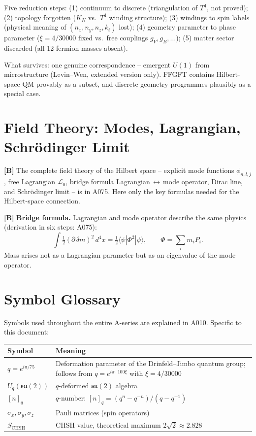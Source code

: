 Five reduction steps: (1) continuum to discrete (triangulation of $T^4$, not
proved); (2) topology forgotten ($K_N$ vs.\ $T^4$ winding structure); (3) windings
to spin labels (physical meaning of $(n_x,n_y,n_z,k_t)$ lost); (4) geometry
parameter to phase parameter ($\xi=4/30000$ fixed vs.\ free couplings
$g_V,g_B,\ldots$); (5) matter sector discarded (all 12 fermion masses absent).

What survives: one genuine correspondence -- emergent $U(1)$ from microstructure
(Levin--Wen, extended version only). FFGFT contains Hilbert-space QM provably as
a subset, and discrete-geometry programmes plausibly as a special case.

\section{Field Theory: Modes, Lagrangian, Schrödinger Limit}

\textbf{[B]} The complete field theory of the Hilbert space -- explicit mode
functions $\phi_{n,l,j}$, free Lagrangian $\mathcal L_0$, bridge formula
Lagrangian$\,\leftrightarrow\,$mode operator, Dirac line, and Schrödinger limit
-- is in A075. Here only the key formulas needed for the Hilbert-space connection.

\textbf{[B]} \textbf{Bridge formula.} Lagrangian and mode operator describe
the same physics (derivation in six steps: A075):
\[
  \int\tfrac12(\partial\,\delta m)^2\,d^4x
  = \tfrac12\langle\psi|\Phi^2|\psi\rangle,
  \qquad \Phi = \sum_i m_i P_i.
\]
Mass arises not as a Lagrangian parameter but as an eigenvalue of the mode operator.

\section{Symbol Glossary}

Symbols used throughout the entire A-series are explained in A010.
Specific to this document:

\begin{center}
\renewcommand{\arraystretch}{1.3}
{\small\begin{tabular}{lp{9cm}}
\toprule
Symbol & Meaning \\
\midrule
$q = e^{i\pi/75}$ & Deformation parameter of the Drinfeld--Jimbo quantum group;
  follows from $q = e^{i\pi\cdot100\xi}$ with $\xi=4/30000$ \\
$U_q(\mathfrak{su}(2))$ & $q$-deformed $\mathfrak{su}(2)$ algebra \\
$[n]_q$ & $q$-number: $[n]_q = (q^n-q^{-n})/(q-q^{-1})$ \\
$\sigma_x,\sigma_y,\sigma_z$ & Pauli matrices (spin operators) \\
$S_\text{CHSH}$ & CHSH value, theoretical maximum $2\sqrt2\approx2{.}828$ \\
\bottomrule
\end{tabular}}
\renewcommand{\arraystretch}{1.0}
\end{center}

